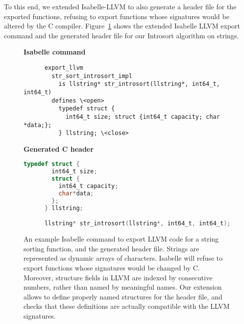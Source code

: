 \documentclass[sigplan,10pt,anonymous,review]{acmart}\settopmatter{printfolios=true,printccs=false,printacmref=false}
\theoremstyle{definition}
\begin{document}
  To this end, we extended Isabelle-LLVM to also generate a header file for the exported functions, refusing to export functions whose signatures
  would be altered by the C compiler. Figure~\ref{fig:export} shows the extended Isabelle LLVM export command and the generated header file for our Introsort algorithm on strings.
  \begin{figure}
    \begin{flushleft}\bfseries\color{black!50} Isabelle command\end{flushleft}
    \begin{lstlisting}
      export_llvm
        str_sort_introsort_impl
          is llstring* str_introsort(llstring*, int64_t, int64_t)
        defines \<open>
          typedef struct {
            int64_t size; struct {int64_t capacity; char *data;};
          } llstring; \<close>
    \end{lstlisting}
    \medskip

    \begin{flushleft}\bfseries\color{black!50} Generated C header\end{flushleft}
    \begin{lstlisting}[language=C]
      typedef struct {
        int64_t size;
        struct {
          int64_t capacity;
          char*data;
        };
      } llstring;

      llstring* str_introsort(llstring*, int64_t, int64_t);
    \end{lstlisting}

    \caption{An example Isabelle command to export LLVM code for a string sorting function, and the generated header file.
    Strings are represented as dynamic arrays of characters.
    Isabelle will refuse to export functions whose signatures
    would be changed by C. Moreover, structure fields in LLVM are indexed by consecutive numbers, rather than named by meaningful names.
    Our extension allows to define properly named structures for the header file, and checks that these definitions are actually compatible with
    the LLVM signatures.
    }\label{fig:export}
  \end{figure}
\end{document}
